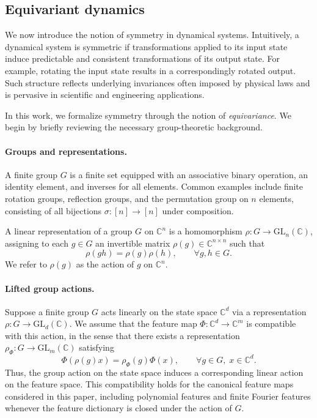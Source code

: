 \documentclass[11pt]{article}
\theoremstyle{plain}
\theoremstyle{definition}
\theoremstyle{remark}
\begin{document}
 
\subsection{Equivariant dynamics}

We now introduce the notion of symmetry in dynamical systems. Intuitively, a dynamical system is symmetric if transformations applied to its input state induce predictable and consistent transformations of its output state. For example, rotating the input state results in a correspondingly rotated output. Such structure reflects underlying invariances often imposed by physical laws and is pervasive in scientific and engineering applications.

In this work, we formalize symmetry through the notion of \emph{equivariance}. We begin by briefly reviewing the necessary group-theoretic background.

\paragraph{Groups and representations.}
A finite group \(G\) is a finite set equipped with an associative binary operation, an identity element, and inverses for all elements. Common examples include finite rotation groups, reflection groups, and the permutation group on \(n\) elements, consisting of all bijections \(\sigma:[n]\to[n]\) under composition.

A linear representation of a group \(G\) on \(\mathbb C^n\) is a homomorphism \(\rho:G\to \mathrm{GL}_n(\mathbb C)\), assigning to each \(g\in G\) an invertible matrix \(\rho(g)\in\mathbb C^{n\times n}\) such that
\[
\rho(gh)=\rho(g)\rho(h), \qquad \forall g,h\in G.
\]
We refer to \(\rho(g)\) as the action of \(g\) on \(\mathbb C^n\).

\paragraph{Lifted group actions.}
Suppose a finite group \(G\) acts linearly on the state space \(\mathbb C^d\) via a representation \(\rho:G\to\mathrm{GL}_d(\mathbb C)\). We assume that the feature map \(\Phi:\mathbb C^d\to\mathbb C^m\) is compatible with this action, in the sense that there exists a representation \(\rho_\Phi:G\to\mathrm{GL}_m(\mathbb C)\) satisfying
\begin{equation}
    \Phi(\rho(g)x)=\rho_\Phi(g)\Phi(x),
    \qquad \forall g\in G,\; x\in\mathbb C^d.
\end{equation}
Thus, the group action on the state space induces a corresponding linear action on the feature space. This compatibility holds for the canonical feature maps considered in this paper, including polynomial features and finite Fourier features whenever the feature dictionary is closed under the action of \(G\).
\end{document}
